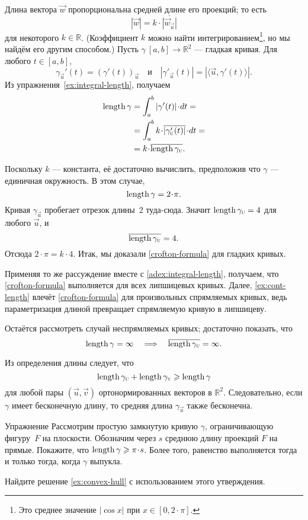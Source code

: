 Длина вектора ${\vec w}$ пропорциональна средней длине его проекций; то есть
\[|{\vec w}|=k\cdot \overline{|{\vec w}_{\vec u}|}\]
для некоторого $k \in \mathbb{R}$.
(Коэффициент $k$ можно найти интегрированием\footnote{Это среднее значение $|\cos x|$ при $x\in [0,2\cdot\pi]$.}, но мы найдём его другим способом.)
Пусть $\gamma\:[a,b]\to\mathbb{R}^2$ --- гладкая кривая.
Для любого $t \in [a,b]$,
\[\gamma_{\vec u}'(t)=(\gamma'(t))_{\vec u}
\quad\text{и}\quad
|\gamma'_{\vec u}(t)|=|\langle\vec u,\gamma'(t)\rangle|.\]
Из упражнения~\ref{ex:integral-length}, получаем
\begin{align*}
\length\gamma
&=\int_a^b|\gamma'(t)|\cdot dt=
\\
&=\int_a^b  k\cdot \overline{|\gamma_{\vec u}'(t)|}\cdot dt=
\\
&=k\cdot \overline{\length\gamma_{\vec u}}.
\end{align*}

Поскольку $k$ --- константа, её достаточно вычислить, предположив что $\gamma$ --- единичная окружность.
В этом случае,
\[\length \gamma=2\cdot\pi.\]
Кривая $\gamma_{\vec u}$ пробегает отрезок длины~2 туда-сюда.
Значит $\mathop{\rm length}\nolimits\gamma_{\text{\sc{u}}}=4$ для любого $\vec u$, и 
\[\overline{\mathop{\rm length}\nolimits\gamma_{\text{\sc{u}}}} =4.\]
Отсюда $2\cdot \pi =k\cdot 4$.
Итак, мы доказали \ref{crofton-formula} для гладких кривых.

Применяя то же рассуждение вместе с \ref{adex:integral-length}, получаем, что \ref{crofton-formula} выполняется для всех липшицевых кривых.
Далее, \ref{ex:cont-length} влечёт \ref{crofton-formula} для произвольных спрямляемых кривых,
ведь параметризация длиной превращает спрямляемую кривую в липшицеву.

Остаётся рассмотреть случай неспрямляемых кривых;
достаточно показать, что 
\[\mathop{\rm length}\nolimits\gamma=\infty
\quad\Longrightarrow\quad
\overline{\mathop{\rm length}\nolimits\gamma_{\text{\sc{u}}}}=\infty.
\]

Из определения длины следует, что
\[\mathop{\rm length}\nolimits\gamma_{\text{\sc{u}}}+\mathop{\rm length}\nolimits\gamma_{\text{\sc{v}}}\geqslant \mathop{\rm length}\nolimits\gamma\]
для любой пары $(\vec u , \vec v )$ ортонормированных векторов в $\mathbb{R}^2$.
Следовательно, если $\gamma$ имеет бесконечную длину, то средняя длина $\gamma_{\vec u}$ также бесконечна.
\qeds

\begin{thm}{Упражнение}\label{ex:convex-croftons}
Рассмотрим простую замкнутую кривую $\gamma$, ограничивающую фигуру~$F$ на плоскости.
Обозначим через $s$ среднюю длину проекций $F$ на прямые.
Покажите, что $\length\gamma\ge \pi \cdot s$.
Более того, равенство выполняется тогда и только тогда, когда $\gamma$ выпукла.

Найдите решение \ref{ex:convex-hull} с использованием этого утверждения.
\end{thm}

